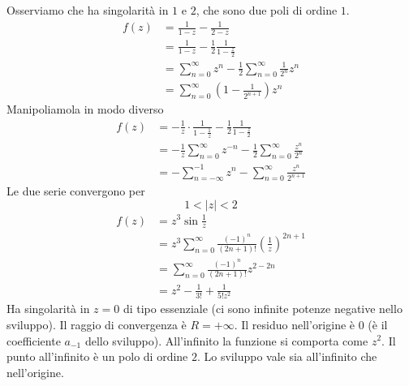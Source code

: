 Osserviamo che ha singolarità in $1$ e $2$, che sono due poli di ordine $1$.
\begin{align*}
f(z) & = \frac{1}{1 - z} - \frac{1}{2 - z}\\
 & = \frac{1}{1 - z} - \frac{1}{2}\frac{1}{1 - \frac{z}{2}}\\
 & = \sum\limits^{\infty}_{n = 0} z^{n} - \frac{1}{2}\sum\limits^{\infty}_{n = 0}\frac{1}{2^{n}} z^{n}\\
 & = \sum\limits^{\infty}_{n = 0}\left(1 - \frac{1}{2^{n + 1}}\right) z^{n}
\end{align*}
Manipoliamola in modo diverso
\begin{align*}
f(z) & = - \frac{1}{z} \cdot \frac{1}{1 - \frac{1}{z}} - \frac{1}{2}\frac{1}{1 - \frac{z}{2}}\\
 & = - \frac{1}{z}\sum\limits^{\infty}_{n = 0} z^{- n} - \frac{1}{2}\sum\limits^{\infty}_{n = 0}\frac{z^{n}}{2^{n}}\\
 & = - \sum\limits^{- 1}_{n = -\infty} z^{n} - \sum\limits^{\infty}_{n = 0}\frac{z^{n}}{2^{n + 1}}
\end{align*}
Le due serie convergono per
\begin{equation*}
1 < \left| z\right| < 2
\end{equation*}
\Soluzione
\begin{align*}
f(z) & = z^{3}\sin\frac{1}{z}\\
 & = z^{3}\sum\limits^{\infty}_{n = 0}\frac{\left(- 1\right)^{n}}{\left(2n + 1\right) !}\left(\frac{1}{z}\right)^{2n + 1}\\
 & = \sum\limits^{\infty}_{n = 0}\frac{\left(- 1\right)^{n}}{\left(2n + 1\right) !} z^{2 - 2n}\\
 & = z^{2} - \frac{1}{3!} + \frac{1}{5!z^{2}}
\end{align*}
Ha singolarità in $z = 0$ di tipo essenziale (ci sono infinite potenze negative nello sviluppo). Il raggio di convergenza è $R = +\infty $. Il residuo nell'origine è $0$ (è il coefficiente $a_{- 1}$ dello sviluppo). All'infinito la funzione si comporta come $z^{2}$. Il punto all'infinito è un polo di ordine $2$. Lo sviluppo vale sia all'infinito che nell'origine.
\Soluzione

